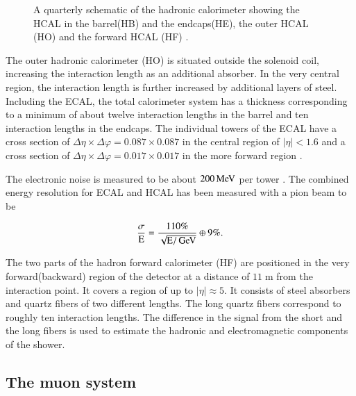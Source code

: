 \begin{figure}[htbp!]
  \begin{center}

\caption{A quarterly schematic of the hadronic calorimeter showing the HCAL in the barrel(HB) and the endcaps(HE), the outer HCAL (HO) and the forward HCAL (HF)  \cite{2010JInst...5T3014C}.
  \label{fig:det_HCAL}}
  \end{center}
\end{figure}



The outer hadronic calorimeter (HO) is situated outside the solenoid coil, increasing the interaction length as an additional absorber.
In the very central region, the interaction length is further increased by additional layers of steel.
Including the ECAL, the total calorimeter system has a thickness corresponding to a minimum of about twelve interaction lengths in the barrel and ten interaction lengths in the endcaps.
The individual towers of the ECAL have a cross section of $\Delta \eta \times \Delta \varphi = 0.087 \times 0.087$ in the central region of $|\eta|< 1.6$ and a cross section of $\Delta \eta \times \Delta \varphi = 0.017 \times 0.017$
in the more forward region \cite{Bayatian:922757}.

The electronic noise is measured to be about $200 \,\text{Me\hspace{-.08em}V}$ per tower \cite{Sirunyan:2017ulk}.
The combined energy resolution for ECAL and HCAL has been measured with a pion beam to be 

\begin{equation}
\frac{\sigma}{\mathrm{E}} = \frac{110\%}{\sqrt{\mathrm{E}/\,\text{Ge\hspace{-.08em}V}}} \oplus 9\%.
\end{equation}

The two parts of the hadron forward calorimeter (HF) are positioned in the very forward(backward) region of the detector at a distance of $11 \; \si{\meter}$ from the interaction point.
It covers a region of up to $|\eta| \approx 5$. It consists of steel absorbers and quartz fibers of two different lengths. The long quartz fibers correspond to roughly ten interaction lengths. The difference in the signal from the short and the long fibers is used to estimate the hadronic and electromagnetic components of the shower.

\subsection{The muon system}

